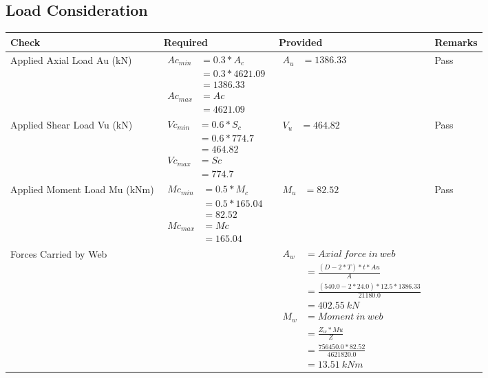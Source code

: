 \documentclass{article}%
\begin{document}
\subsection{Load Consideration}%
\label{subsec:LoadConsideration}%
\renewcommand{\arraystretch}{1.2}%
\begin{longtable}{|p{4cm}|p{3.5cm}|p{6.5cm}|p{1.5cm}|}%
\hline%
\rowcolor{OsdagGreen}%
Check&Required&Provided&Remarks\\%
\hline%
\endhead%
\hline%
Applied Axial Load Au (kN)&$\begin{aligned} Ac_{min} &= 0.3 * A_c\\ &= 0.3 *4621.09\\ &=1386.33\\ Ac_{max} &= Ac \\ &=4621.09\end{aligned}$&$\begin{aligned} A_u &=1386.33\end{aligned}$&Pass\\%
\hline%
Applied Shear Load Vu (kN)&$\begin{aligned} Vc_{min} &= 0.6 * S_c\\ &= 0.6 *774.7\\ &=464.82\\ Vc_{max} &= Sc \\ &=774.7\end{aligned}$&$\begin{aligned} V_u &=464.82\end{aligned}$&Pass\\%
\hline%
Applied Moment Load Mu (kNm)&$\begin{aligned} Mc_{min} &= 0.5 * M_c\\ &= 0.5 *165.04\\ &=82.52\\  Mc_{max} &= Mc \\ &=165.04\end{aligned}$&$\begin{aligned} M_u &=82.52\end{aligned}$&Pass\\%
\hline%
Forces Carried by Web&&$\begin{aligned}A_w &= Axial~ force~ in~ web  \\   &= \frac{(D- 2*T)*t* Au }{A} \\ &= \frac{(540.0- 2*24.0)*12.5*1386.33 }{21180.0} \\ &=402.55~ kN\\ M_w &= Moment ~in ~web  \\  &= \frac{Z_w * Mu}{Z} \\ &= \frac{756450.0 * 82.52}{4621820.0} \\ &=13.51~{kNm}\end{aligned}$&\\%

\end{longtable}
\end{document}
